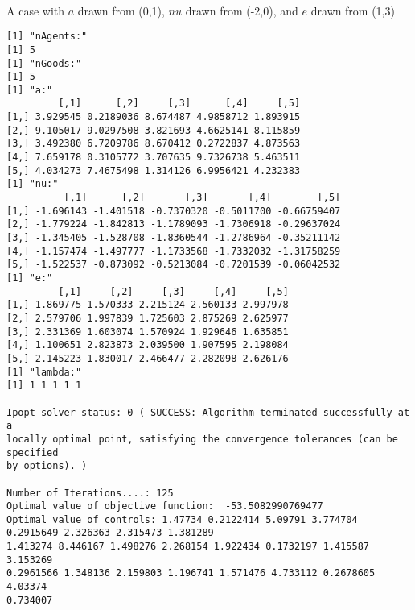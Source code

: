 \documentclass[11pt]{article}
\begin{document}
\paragraph{} A case with $a$ drawn from (0,1), $nu$ drawn from (-2,0), and $e$ drawn from (1,3)

\begin{verbatim}
[1] "nAgents:"
[1] 5
[1] "nGoods:"
[1] 5
[1] "a:"
         [,1]      [,2]     [,3]      [,4]     [,5]
[1,] 3.929545 0.2189036 8.674487 4.9858712 1.893915
[2,] 9.105017 9.0297508 3.821693 4.6625141 8.115859
[3,] 3.492380 6.7209786 8.670412 0.2722837 4.873563
[4,] 7.659178 0.3105772 3.707635 9.7326738 5.463511
[5,] 4.034273 7.4675498 1.314126 6.9956421 4.232383
[1] "nu:"
          [,1]      [,2]       [,3]       [,4]        [,5]
[1,] -1.696143 -1.401518 -0.7370320 -0.5011700 -0.66759407
[2,] -1.779224 -1.842813 -1.1789093 -1.7306918 -0.29637024
[3,] -1.345405 -1.528708 -1.8360544 -1.2786964 -0.35211142
[4,] -1.157474 -1.497777 -1.1733568 -1.7332032 -1.31758259
[5,] -1.522537 -0.873092 -0.5213084 -0.7201539 -0.06042532
[1] "e:"
         [,1]     [,2]     [,3]     [,4]     [,5]
[1,] 1.869775 1.570333 2.215124 2.560133 2.997978
[2,] 2.579706 1.997839 1.725603 2.875269 2.625977
[3,] 2.331369 1.603074 1.570924 1.929646 1.635851
[4,] 1.100651 2.823873 2.039500 1.907595 2.198084
[5,] 2.145223 1.830017 2.466477 2.282098 2.626176
[1] "lambda:"
[1] 1 1 1 1 1

Ipopt solver status: 0 ( SUCCESS: Algorithm terminated successfully at a 
locally optimal point, satisfying the convergence tolerances (can be specified 
by options). )

Number of Iterations....: 125 
Optimal value of objective function:  -53.5082990769477 
Optimal value of controls: 1.47734 0.2122414 5.09791 3.774704 0.2915649 2.326363 2.315473 1.381289 
1.413274 8.446167 1.498276 2.268154 1.922434 0.1732197 1.415587 3.153269 
0.2961566 1.348136 2.159803 1.196741 1.571476 4.733112 0.2678605 4.03374 
0.734007


\end{verbatim}
\end{document}

